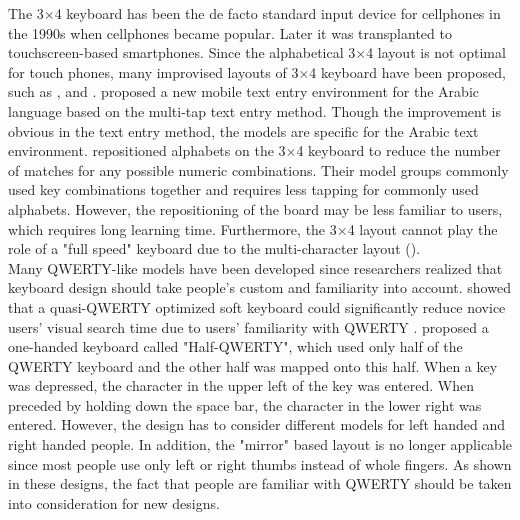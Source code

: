 \documentclass{singlecol-new}
\theoremstyle{TH}{
\newtheorem{lemma}{Lemma}
\newtheorem{theorem}[lemma]{Theorem}
\newtheorem{corrolary}[lemma]{Corrolary}
\newtheorem{conjecture}[lemma]{Conjecture}
\newtheorem{proposition}[lemma]{Proposition}
\newtheorem{claim}[lemma]{Claim}
\newtheorem{stheorem}[lemma]{Wrong Theorem}
\newtheorem{algorithm}{Algorithm}
}
\theoremstyle{THrm}{
\newtheorem{definition}{Definition}[section]
\newtheorem{question}{Question}[section]
\newtheorem{remark}{Remark}
\newtheorem{scheme}{Scheme}
}
\theoremstyle{THhit}{
\newtheorem{case}{Case}[section]
}
\begin{document}
The 3$\times$4 keyboard has been the de facto standard input device for cellphones in the 1990s when cellphones became popular. Later it was transplanted to touchscreen-based smartphones. Since the alphabetical 3$\times$4 layout is not optimal for touch phones, many improvised layouts of 3$\times$4 keyboard have been proposed, such as \citet{al2011improving}, \citet{hwang2005qwerty} and \citet{mittal2009improvised}. \citet{al2011improving} proposed a new mobile text entry environment for the Arabic language based on the multi-tap text entry method. Though the improvement is obvious in the text entry method, the models are specific for the Arabic text environment. \citet{mittal2009improvised} repositioned alphabets on the 3$\times$4 keyboard to reduce the number of matches for any possible numeric combinations. Their model groups commonly used key combinations together and requires less tapping for commonly used alphabets. However, the repositioning of the board may be less familiar to users, which requires long learning time. Furthermore, the 3$\times$4 layout cannot play the role of a "full speed" keyboard due to the multi-character layout (\citep{hwang2005qwerty}). \\

Many QWERTY-like models have been developed since researchers realized that keyboard design should take people's custom and familiarity into account. \citet{bi2010quasi} showed that a quasi-QWERTY optimized soft keyboard could significantly reduce novice users' visual search time due to users' familiarity with QWERTY . \citet{matias1994half}proposed a one-handed keyboard called "Half-QWERTY", which used only half of the QWERTY keyboard and the other half was mapped onto this half. When a key was depressed, the character in the upper left of the key was entered. When preceded by holding down the space bar, the character in the lower right was entered. However, the design has to consider different models for left handed and right handed people. In addition, the "mirror" based layout is no longer applicable since most people use only left or right thumbs instead of whole fingers. As shown in these designs, the fact that people are familiar with QWERTY should be taken into consideration for new designs. \\
\end{document}
